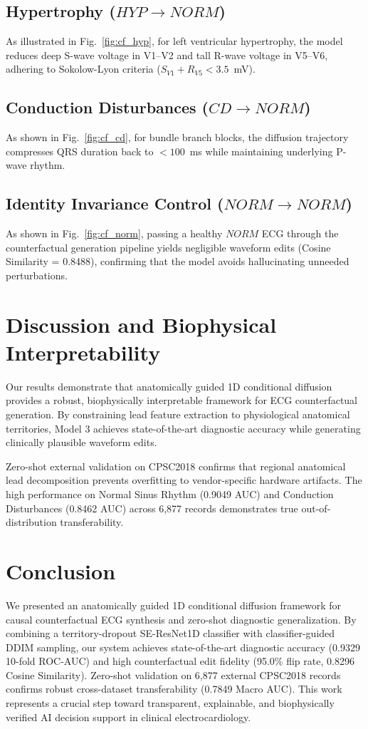 \documentclass[5p,twocolumn,10pt]{elsarticle}
\begin{document}
\subsection{Hypertrophy ($HYP \to NORM$)}
As illustrated in Fig.~\ref{fig:cf_hyp}, for left ventricular hypertrophy, the model reduces deep S-wave voltage in V1--V2 and tall R-wave voltage in V5--V6, adhering to Sokolow-Lyon criteria ($S_{V1} + R_{V5} < 3.5$~mV).

\subsection{Conduction Disturbances ($CD \to NORM$)}
As shown in Fig.~\ref{fig:cf_cd}, for bundle branch blocks, the diffusion trajectory compresses QRS duration back to $< 100$~ms while maintaining underlying P-wave rhythm.

\subsection{Identity Invariance Control ($NORM \to NORM$)}
As shown in Fig.~\ref{fig:cf_norm}, passing a healthy $NORM$ ECG through the counterfactual generation pipeline yields negligible waveform edits (Cosine Similarity = 0.8488), confirming that the model avoids hallucinating unneeded perturbations.

\section{Discussion and Biophysical Interpretability}
\label{sec:discussion}

Our results demonstrate that anatomically guided 1D conditional diffusion provides a robust, biophysically interpretable framework for ECG counterfactual generation. By constraining lead feature extraction to physiological anatomical territories, Model 3 achieves state-of-the-art diagnostic accuracy while generating clinically plausible waveform edits.

Zero-shot external validation on CPSC2018 confirms that regional anatomical lead decomposition prevents overfitting to vendor-specific hardware artifacts. The high performance on Normal Sinus Rhythm (0.9049 AUC) and Conduction Disturbances (0.8462 AUC) across 6,877 records demonstrates true out-of-distribution transferability.

\section{Conclusion}
\label{sec:conclusion}
We presented an anatomically guided 1D conditional diffusion framework for causal counterfactual ECG synthesis and zero-shot diagnostic generalization. By combining a territory-dropout SE-ResNet1D classifier with classifier-guided DDIM sampling, our system achieves state-of-the-art diagnostic accuracy (0.9329 10-fold ROC-AUC) and high counterfactual edit fidelity (95.0\% flip rate, 0.8296 Cosine Similarity). Zero-shot validation on 6,877 external CPSC2018 records confirms robust cross-dataset transferability (0.7849 Macro AUC). This work represents a crucial step toward transparent, explainable, and biophysically verified AI decision support in clinical electrocardiology.
\end{document}
